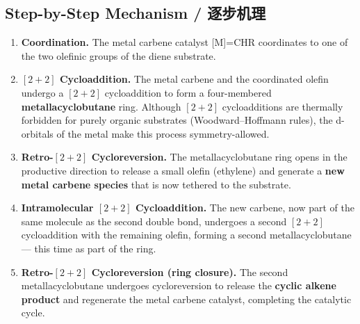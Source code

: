 \documentclass[11pt, a4paper]{article}
\begin{document}
\subsection{Step-by-Step Mechanism / 逐步机理}

\begin{enbox}
\begin{enumerate}[label=\textbf{Step \arabic*:}, leftmargin=2.5cm]
  \item \textbf{Coordination.}  The metal carbene catalyst [M]=CHR coordinates to one of the two olefinic groups of the diene substrate.

  \item \textbf{$[2+2]$ Cycloaddition.}  The metal carbene and the coordinated olefin undergo a $[2+2]$ cycloaddition to form a four-membered \textbf{metallacyclobutane} ring.  Although $[2+2]$ cycloadditions are thermally forbidden for purely organic substrates (Woodward--Hoffmann rules), the d-orbitals of the metal make this process symmetry-allowed.

  \item \textbf{Retro-$[2+2]$ Cycloreversion.}  The metallacyclobutane ring opens in the productive direction to release a small olefin (ethylene) and generate a \textbf{new metal carbene species} that is now tethered to the substrate.

  \item \textbf{Intramolecular $[2+2]$ Cycloaddition.}  The new carbene, now part of the same molecule as the second double bond, undergoes a second $[2+2]$ cycloaddition with the remaining olefin, forming a second metallacyclobutane --- this time as part of the ring.

  \item \textbf{Retro-$[2+2]$ Cycloreversion (ring closure).}  The second metallacyclobutane undergoes cycloreversion to release the \textbf{cyclic alkene product} and regenerate the metal carbene catalyst, completing the catalytic cycle.
\end{enumerate}
\end{enbox}
\end{document}
